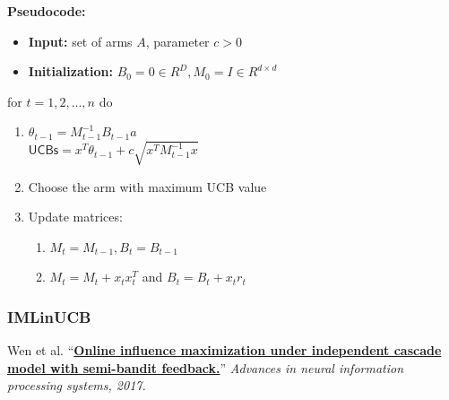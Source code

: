 \documentclass[10pt,a4paper]{article}
\begin{document}
\textbf{Pseudocode:}
\begin{itemize}
\item \textbf{Input:} set of arms $A$, parameter $c>0$
\item \textbf{Initialization:} $B_0 = 0 \in R^D, M_0 = I \in R^{d \times d}$
\end{itemize}
for $t=1, 2, \ldots, n$ do
\begin{enumerate}
\item $\theta_{t-1} = M_{t-1}^{-1} B_{t-1}a$\\
$\mathsf{UCBs} = x^T \theta_{t-1} + c \sqrt{x^T M_{t-1}^{-1} x}$
\item Choose the arm with maximum UCB value
\item Update matrices:
\begin{enumerate}
\item $M_t = M_{t-1}, B_t = B_{t-1}$
\item $M_t = M_t + x_t x_t^T$ and $B_t = B_t + x_t r_t$
\end{enumerate}
\end{enumerate}

\subsubsection{IMLinUCB}\label{imlinucb}

Wen et al. ``\href{https://dl.acm.org/doi/10.5555/3294996.3295062}{\textbf{Online influence maximization under independent cascade model with semi-bandit feedback.}}'' \textit{Advances in neural information processing systems, 2017.}
\end{document}
